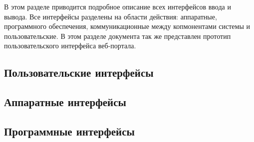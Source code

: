 В этом разделе приводится подробное описание всех интерфейсов ввода и вывода. Все интерфейсы разделены на области действия: аппаратные, программного обеспечения, коммуникационные между копмонентами системы и пользовательские. В этом разделе документа так же представлен прототип пользовательского интерфейса веб-портала.

\subsection{Пользовательские интерфейсы}


\subsection{Аппаратные интерфейсы}


\subsection{Программные интерфейсы}


%

